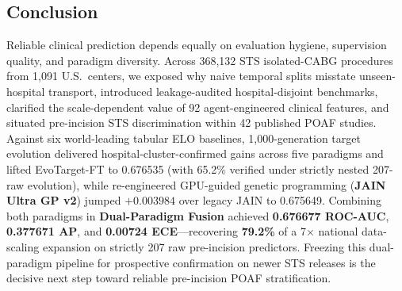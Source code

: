 \subsection{Conclusion}
Reliable clinical prediction depends equally on evaluation hygiene, supervision quality, and paradigm diversity. Across 368,132 STS isolated-CABG procedures from 1,091 U.S.\ centers, we exposed why naive temporal splits misstate unseen-hospital transport, introduced leakage-audited hospital-disjoint benchmarks, clarified the scale-dependent value of 92 agent-engineered clinical features, and situated pre-incision STS discrimination within 42 published POAF studies. Against six world-leading tabular ELO baselines, 1,000-generation target evolution delivered hospital-cluster-confirmed gains across five paradigms and lifted EvoTarget-FT to 0.676535 (with 65.2\% verified under strictly nested 207-raw evolution), while re-engineered GPU-guided genetic programming (\textbf{JAIN Ultra GP v2}) jumped $+0.003984$ over legacy JAIN to 0.675649. Combining both paradigms in \textbf{Dual-Paradigm Fusion} achieved \textbf{0.676677 ROC-AUC}, \textbf{0.377671 AP}, and \textbf{0.00724 ECE}---recovering \textbf{79.2\%} of a 7$\times$ national data-scaling expansion on strictly 207 raw pre-incision predictors. Freezing this dual-paradigm pipeline for prospective confirmation on newer STS releases is the decisive next step toward reliable pre-incision POAF stratification.
